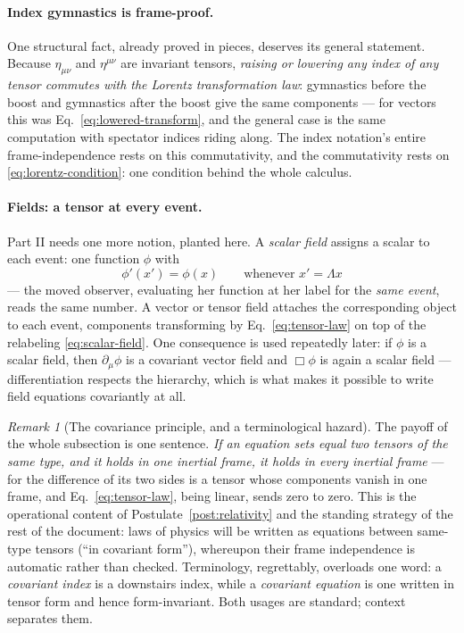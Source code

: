 \documentclass[11pt]{article}
\theoremstyle{plain}
\theoremstyle{definition}
\theoremstyle{remark}
\newtheorem{remark}[theorem]{Remark}
\begin{document}
\paragraph{Index gymnastics is frame-proof.} One structural fact,
already proved in pieces, deserves its general statement. Because
$\eta_{\mu\nu}$ and $\eta^{\mu\nu}$ are invariant tensors,
\emph{raising or lowering any index of any tensor commutes with the
Lorentz transformation law}: gymnastics before the boost and
gymnastics after the boost give the same components --- for vectors
this was Eq.~\eqref{eq:lowered-transform}, and the general case is
the same computation with spectator indices riding along. The index
notation's entire frame-independence rests on this commutativity, and
the commutativity rests on \eqref{eq:lorentz-condition}: one
condition behind the whole calculus.

\paragraph{Fields: a tensor at every event.} Part II needs one more
notion, planted here. A \emph{scalar field} assigns a scalar to each
event: one function $\phi$ with
\begin{equation}
  \phi'(x') = \phi(x)
  \qquad\text{whenever } x' = \Lambda x
  \label{eq:scalar-field}
\end{equation}
--- the moved observer, evaluating her function at her label for the
\emph{same event}, reads the same number. A vector or tensor field
attaches the corresponding object to each event, components
transforming by Eq.~\eqref{eq:tensor-law} on top of the relabeling
\eqref{eq:scalar-field}. One consequence is used repeatedly later:
if $\phi$ is a scalar field, then $\partial_\mu\phi$ is a covariant
vector field and $\Box\phi$ is again a scalar field ---
differentiation respects the hierarchy, which is what makes it
possible to write field equations covariantly at all.

\begin{remark}[The covariance principle, and a terminological hazard]
\label{rem:covariance-principle}
The payoff of the whole subsection is one sentence. \emph{If an
equation sets equal two tensors of the same type, and it holds in one
inertial frame, it holds in every inertial frame} --- for the
difference of its two sides is a tensor whose components vanish in one
frame, and Eq.~\eqref{eq:tensor-law}, being linear, sends zero to
zero. This is the operational content of
Postulate~\ref{post:relativity} and the standing strategy of the rest
of the document: laws of physics will be written as equations between
same-type tensors (``in covariant form''), whereupon their frame
independence is automatic rather than checked. Terminology, regrettably,
overloads one word: a \emph{covariant index} is a downstairs index,
while a \emph{covariant equation} is one written in tensor form and
hence form-invariant. Both usages are standard; context separates
them.
\end{remark}
\end{document}

